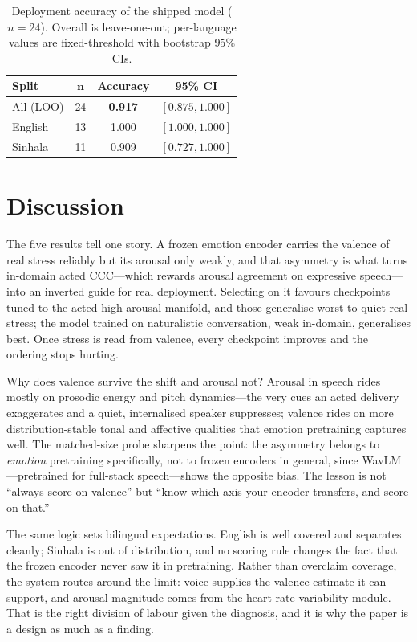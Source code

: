 \documentclass[conference]{IEEEtran}
\begin{document}
\begin{table}[t]
\caption{Deployment accuracy of the shipped model ($n=24$). Overall is
leave-one-out; per-language values are fixed-threshold with bootstrap $95\%$ CIs.}
\label{tab:deploy}
\centering
\setlength{\tabcolsep}{5pt}
\renewcommand{\arraystretch}{1.2}
\begin{tabular}{|l|c|c|c|}
\hline
\textbf{Split} & $\mathbf{n}$ & \textbf{Accuracy} & \textbf{95\% CI} \\
\hline
All (LOO)  & 24 & \textbf{0.917} & $[0.875,1.000]$ \\
\hline
English    & 13 & 1.000 & $[1.000,1.000]$ \\
\hline
Sinhala    & 11 & 0.909 & $[0.727,1.000]$ \\
\hline
\end{tabular}
\end{table}

\section{Discussion}
The five results tell one story. A frozen emotion encoder carries the valence of
real stress reliably but its arousal only weakly, and that asymmetry is what turns
in-domain acted CCC---which rewards arousal agreement on expressive speech---into an
inverted guide for real deployment. Selecting on it favours checkpoints tuned to
the acted high-arousal manifold, and those generalise worst to quiet real stress;
the model trained on naturalistic conversation, weak in-domain, generalises best.
Once stress is read from valence, every checkpoint improves and the ordering stops
hurting.

Why does valence survive the shift and arousal not? Arousal in speech rides mostly
on prosodic energy and pitch dynamics---the very cues an acted delivery exaggerates
and a quiet, internalised speaker suppresses; valence rides on more
distribution-stable tonal and affective qualities that emotion pretraining captures
well. The matched-size probe sharpens the point: the asymmetry belongs to
\emph{emotion} pretraining specifically, not to frozen encoders in general, since
WavLM---pretrained for full-stack speech---shows the opposite bias. The lesson is
not ``always score on valence'' but ``know which axis your encoder transfers, and
score on that.''

The same logic sets bilingual expectations. English is well covered and separates
cleanly; Sinhala is out of distribution, and no scoring rule changes the fact that
the frozen encoder never saw it in pretraining. Rather than overclaim coverage, the
system routes around the limit: voice supplies the valence estimate it can support,
and arousal magnitude comes from the heart-rate-variability module. That is the
right division of labour given the diagnosis, and it is why the paper is a design
as much as a finding.
\end{document}
